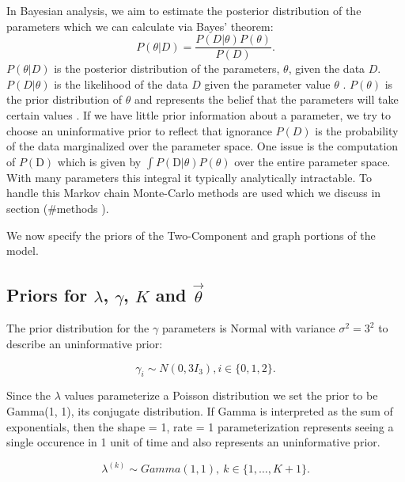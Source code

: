 \documentclass[11pt,a4paper]{article}
\numberwithin{equation}{section}
\begin{document}
In Bayesian analysis, we aim to estimate the posterior distribution of
the parameters which we can calculate via Bayes' theorem:
\[ P(\theta|D) = \frac{P(D|\theta)P(\theta)}{P(D)}.\] \(P(\theta|D)\) is
the posterior distribution of the parameters, \(\theta\), given the data
\(D\). \(P(D|\theta)\) is the likelihood of the data \(D\) given the
parameter value \(\theta\) . \(P(\theta)\) is the prior distribution of
\(\theta\) and represents the belief that the parameters will take
certain values . If we have little prior information about a parameter,
we try to choose an uninformative prior to reflect that ignorance
\(P(D)\) is the probability of the data marginalized over the parameter
space. One issue is the computation of \(P(\text{D})\) which is given by
\(\int P(\text{D}|\theta)P(\theta)\) over the entire parameter space.
With many parameters this integral it typically analytically
intractable. To handle this Markov chain Monte-Carlo methods are used
which we discuss in section (\#methods ).

We now specify the priors of the Two-Component and graph portions of the
model.

\hypertarget{priors-for-lambda-gamma-k-and-vectheta}{%
\subsection{\texorpdfstring{Priors for \(\lambda\), \(\gamma\), \(K\)
and
\(\vec{\theta}\)}{Priors for \textbackslash{}lambda, \textbackslash{}gamma, K and \textbackslash{}vec\{\textbackslash{}theta\}}}\label{priors-for-lambda-gamma-k-and-vectheta}}

The prior distribution for the \(\gamma\) parameters is Normal with
variance \(\sigma^2 = 3^2\) to describe an uninformative prior:

\[\gamma_i \sim N(0, 3I_3), i \in \{0,1,2\}.\]

Since the \(\lambda\) values parameterize a Poisson distribution we set
the prior to be Gamma(1, 1), its conjugate distribution. If Gamma is
interpreted as the sum of exponentials, then the shape = 1, rate = 1
parameterization represents seeing a single occurence in 1 unit of time
and also represents an uninformative prior.

\[ \lambda^{(k)} \sim Gamma(1, 1),\ k \in \{1, \dots, K + 1\}.\]
\end{document}
